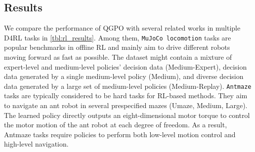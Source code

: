 \begin{table}[t]
    \begin{center}
    \begin{small}
    \end{small}
    \end{center}
    \vspace{-0.1in}
    \caption{Effect of CEP guidance (left) on image sample quality compared with classifier guidance (right).}
    \vspace{-0.15in}
    \label{tab:guide2}
\end{table}

\subsection{Results}
\label{Sec:rl_result}
We compare the performance of QGPO with several related works in multiple D4RL \citep{d4rl} tasks in \cref{tbl:rl_results}. Among them, \texttt{MuJoCo locomotion} tasks are popular benchmarks in offline RL and mainly aim to drive different robots moving forward as fast as possible. The dataset might contain a mixture of expert-level and medium-level policies' decision data (Medium-Expert), decision data generated by a single medium-level policy (Medium), and diverse decision data generated by a large set of medium-level policies (Medium-Replay). \texttt{Antmaze} tasks are typically considered to be hard tasks for RL-based methods. They aim to navigate an ant robot in several prespecified mazes (Umaze, Medium, Large). The learned policy directly outputs an eight-dimensional motor torque to control the motor motion of the ant robot at each degree of freedom. As a result, Antmaze tasks require policies to perform both low-level motion control and high-level navigation.

